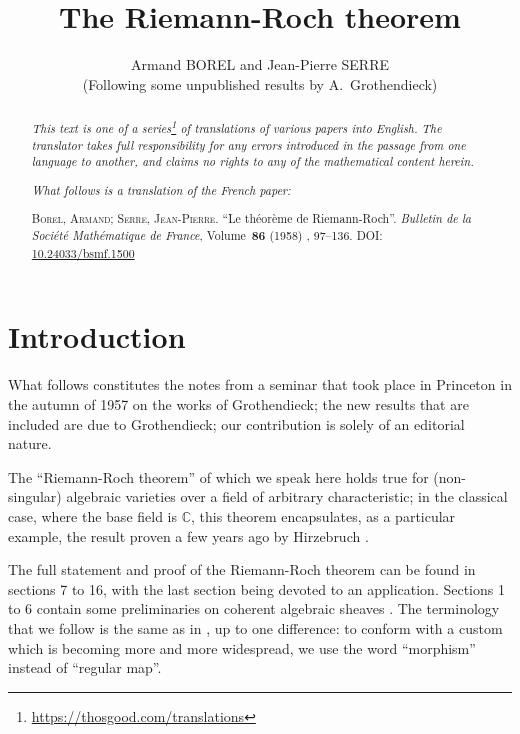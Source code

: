 \documentclass{article}
\title{The Riemann-Roch theorem}
\author{Armand BOREL and Jean-Pierre SERRE\\(Following some unpublished results by A.~Grothendieck)}
\date{}
\newcommand{\doctype}{French paper}
\newcommand{\origcit}{%
  \textsc{Borel, Armand}; \textsc{Serre, Jean-Pierre}.
  ``Le th\'{e}or\`{e}me de Riemann-Roch''.
  \emph{Bulletin de la Soci\'{e}t\'{e} Math\'{e}matique de France}, Volume~\textbf{86} (1958) , 97--136.
  \textsc{DOI}: \href{https://www.doi.org/10.24033/bsmf.1500}{10.24033/bsmf.1500}%
}
\newcommand{\oldpage}[1]{\marginpar{\footnotesize$\Big\vert$ \textit{p.~#1}}}
\begin{document}
\maketitle
\thispagestyle{fancy}

\renewcommand{\abstractname}{Translator's note.}

\begin{abstract}
  \renewcommand*{\thefootnote}{\fnsymbol{footnote}}
  \emph{This text is one of a series\footnote{\url{https://thosgood.com/translations}} of translations of various papers into English.}
  \emph{The translator takes full responsibility for any errors introduced in the passage from one language to another, and claims no rights to any of the mathematical content herein.}

  \medskip
  
  \emph{What follows is a translation of the \doctype:}

  \medskip\noindent
  \origcit
\end{abstract}

\setcounter{footnote}{0}

\tableofcontents



\section*{Introduction}

\oldpage{97}
What follows constitutes the notes from a seminar that took place in Princeton in the autumn of 1957 on the works of Grothendieck;
the new results that are included are due to Grothendieck;
our contribution is solely of an editorial nature.

The ``Riemann-Roch theorem'' of which we speak here holds true for (non-singular) algebraic varieties over a field of arbitrary characteristic;
in the classical case, where the base field is $\mathbb{C}$, this theorem encapsulates, as a particular example, the result proven a few years ago by Hirzebruch \cite{9}.

The full statement and proof of the Riemann-Roch theorem can be found in sections 7 to 16, with the last section being devoted to an application.
Sections 1 to 6 contain some preliminaries on coherent algebraic sheaves \cite{12}.
The terminology that we follow is the same as in \cite{12}, up to one difference: to conform with a custom which is becoming more and more widespread, we use the word ``morphism'' instead of ``regular map''.
\end{document}
